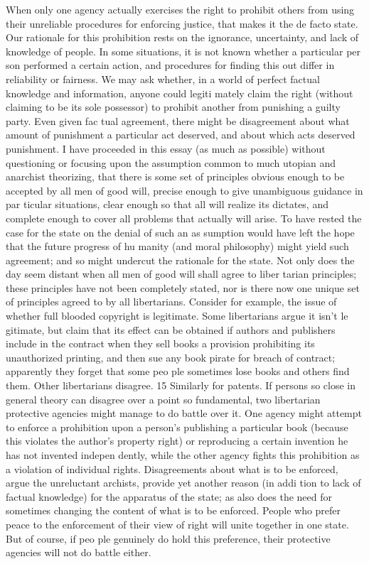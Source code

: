 \documentclass[11pt,openany]{book}
\begin{document}
When only one agency actually exercises the right to prohibit others from using their unreliable procedures for enforcing justice, that makes it the de facto state. Our rationale for this prohibition rests on the ignorance, uncertainty, and lack of knowledge of people. In some situations, it is not known whether a particular per son performed a certain action, and procedures for finding this out differ in reliability or fairness. We may ask whether, in a world of perfect factual knowledge and information, anyone could legiti mately claim the right (without claiming to be its sole possessor) to prohibit another from punishing a guilty party. Even given fac tual agreement, there might be disagreement about what amount of punishment a particular act deserved, and about which acts deserved punishment. I have proceeded in this essay (as much as possible) without questioning or focusing upon the assumption common to much utopian and anarchist theorizing, that there is some set of principles obvious enough to be accepted by all men of good will, precise enough to give unambiguous guidance in par ticular situations, clear enough so that all will realize its dictates, and complete enough to cover all problems that actually will arise. To have rested the case for the state on the denial of such an as sumption would have left the hope that the future progress of hu manity (and moral philosophy) might yield such agreement; and so might undercut the rationale for the state. Not only does the day seem distant when all men of good will shall agree to liber tarian principles; these principles have not been completely stated, nor is there now one unique set of principles agreed to by all libertarians. Consider for example, the issue of whether full blooded copyright is legitimate. Some libertarians argue it isn't le gitimate, but claim that its effect can be obtained if authors and publishers include in the contract when they sell books a provision prohibiting its unauthorized printing, and then sue any book pirate for breach of contract; apparently they forget that some peo ple sometimes lose books and others find them. Other libertarians disagree. 15 Similarly for patents. If persons so close in general theory can disagree over a point so fundamental, two libertarian protective agencies might manage to do battle over it. One agency might attempt to enforce a prohibition upon a person's publishing a particular book (because this violates the author's property right) or reproducing a certain invention he has not invented indepen dently, while the other agency fights this prohibition as a violation of individual rights. Disagreements about what is to be enforced, argue the unreluctant archists, provide yet another reason (in addi tion to lack of factual knowledge) for the apparatus of the state; as also does the need for sometimes changing the content of what is to be enforced. People who prefer peace to the enforcement of their view of right will unite together in one state. But of course, if peo ple genuinely do hold this preference, their protective agencies will not do battle either. 
\end{document}
